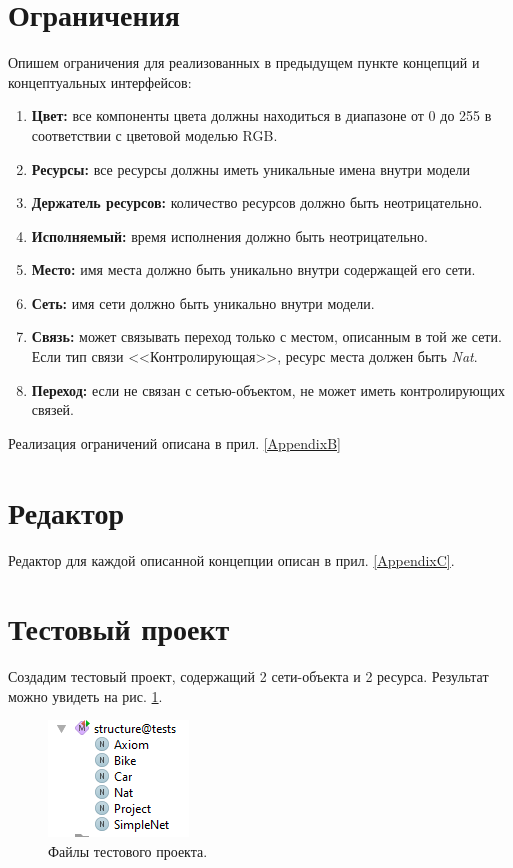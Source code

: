 	\section{Ограничения}
		Опишем ограничения для реализованных в предыдущем пункте концепций и концептуальных интерфейсов:
		\begin{enumerate}
			\item \textbf{Цвет:} все компоненты цвета должны находиться в диапазоне от 0 до 255 в соответствии с цветовой моделью RGB.
			\item \textbf{Ресурсы:} все ресурсы должны иметь уникальные имена внутри модели
			\item \textbf{Держатель ресурсов:} количество ресурсов должно быть неотрицательно.
			\item \textbf{Исполняемый:} время исполнения должно быть неотрицательно.
			\item \textbf{Место:} имя места должно быть уникально внутри содержащей его сети.
			\item \textbf{Сеть:} имя сети должно быть уникально внутри модели.
			\item \textbf{Связь:} может связывать переход только с местом, описанным в той же сети. Если тип связи <<Контролирующая>>, ресурс места должен быть \textit{Nat}.
			\item \textbf{Переход:} если не связан с сетью-объектом, не может иметь контролирующих связей.
		\end{enumerate}
			
		Реализация ограничений описана в прил. \ref{AppendixB}
		
	\section{Редактор}
		Редактор для каждой описанной концепции описан в прил. \ref{AppendixC}.
		
	\section{Тестовый проект}
		Создадим тестовый проект, содержащий 2 сети-объекта и 2 ресурса. Результат можно увидеть на рис. \ref{fig:project-tree}.	

		\begin{figure}[th]
			\centering
			\includegraphics[width=0.3\linewidth]{images/test-project/project-tree}
			\caption{Файлы тестового проекта.}
			\label{fig:project-tree}
		\end{figure}
	
